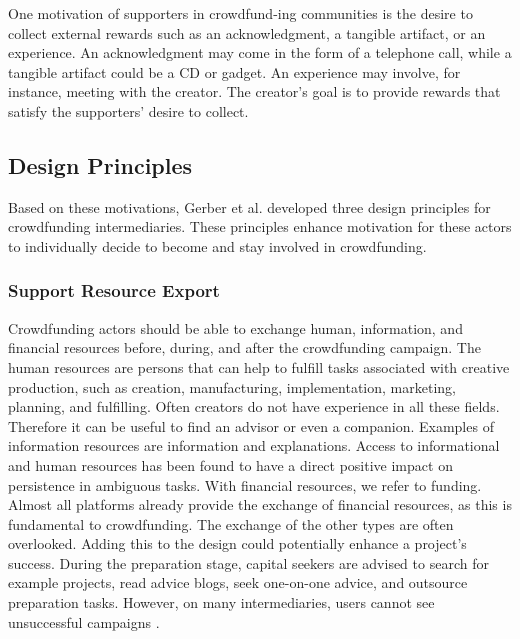 One motivation of supporters in crowdfund-ing communities is the desire to collect external rewards such as an acknowledgment, a tangible artifact, or an experience. An acknowledgment may come in the form of a telephone call, while a tangible artifact could be a CD or gadget. An experience may involve, for instance, meeting with the creator. The creator’s goal is to provide rewards that satisfy the supporters’ desire to collect.

\subsection{Design Principles}
Based on these motivations, Gerber et al. \cite{crowdMotiv} developed three design principles for crowdfunding
intermediaries. These principles enhance motivation for these actors to individually decide to become and
stay involved in crowdfunding.

\subsubsection*{Support Resource Export}
Crowdfunding actors should be able to exchange human, information, and financial resources before, during, and after the crowdfunding campaign. The human resources are persons that can help to fulfill tasks
associated with creative production, such as creation, manufacturing, implementation, marketing, planning,
and fulfilling. Often creators do not have experience in all these fields. Therefore it can be useful to find
an advisor or even a companion. Examples of information resources are information and explanations. Access to informational and human resources has been found to have a direct positive impact on persistence
in ambiguous tasks. With financial resources, we refer to funding. Almost all platforms already provide the
exchange of financial resources, as this is fundamental to crowdfunding. The exchange of the other types are
often overlooked. Adding this to the design could potentially enhance a project’s success.
During the preparation stage, capital seekers are advised to search for example projects, read advice blogs,
seek one-on-one advice, and outsource preparation tasks. However, on many intermediaries, users cannot
see unsuccessful campaigns \cite{10.1145/2531602.2531715}.

